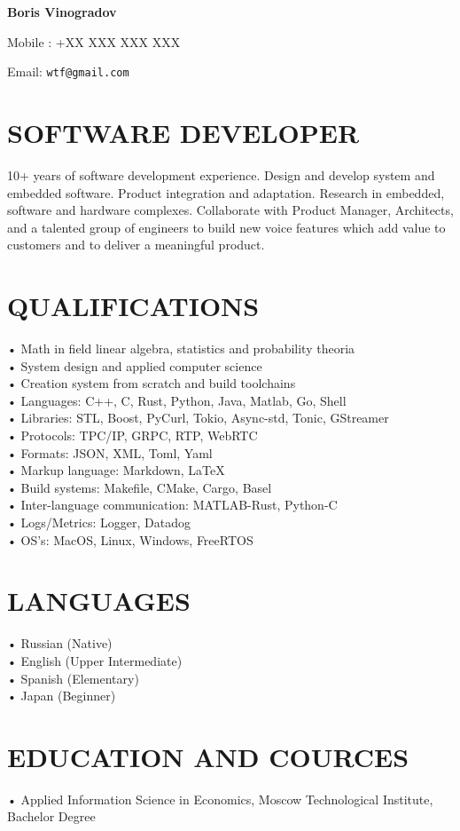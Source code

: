 \documentclass{article}
\begin{document}
\textbf{Boris Vinogradov}

Mobile : +XX XXX XXX XXX

Email: \texttt{wtf@gmail.com}

\section{\textsf{SOFTWARE DEVELOPER}}
10+ years of software development experience. Design and develop system and embedded software. Product
integration and adaptation. Research in embedded, software and hardware complexes. Collaborate with Product
Manager, Architects, and a talented group of engineers to build new voice features which add value to customers
and to deliver a meaningful product.

\section{\textsf{QUALIFICATIONS}}
• Math in field linear algebra, statistics and probability theoria\\
• System design and applied computer science\\
• Creation system from scratch and build toolchains\\
• Languages: C++, C, Rust, Python, Java, Matlab, Go, Shell\\
• Libraries: STL, Boost, PyCurl, Tokio, Async-std, Tonic, GStreamer\\
• Protocols: TPC/IP, GRPC, RTP, WebRTC\\
• Formats: JSON, XML, Toml, Yaml\\
• Markup language: Markdown, \LaTeX\\
• Build systems: Makefile, CMake, Cargo, Basel\\
• Inter-language communication: MATLAB-Rust, Python-C\\
• Logs/Metrics: Logger, Datadog\\
• OS’s: MacOS, Linux, Windows, FreeRTOS

\section{\textsf{LANGUAGES}}
• Russian (Native)\\
• English (Upper Intermediate)\\
• Spanish (Elementary)\\
• Japan (Beginner)

\section{\textsf{EDUCATION AND COURCES}}
• Applied Information Science in Economics, Moscow Technological Institute, Bachelor Degree
\end{document}
